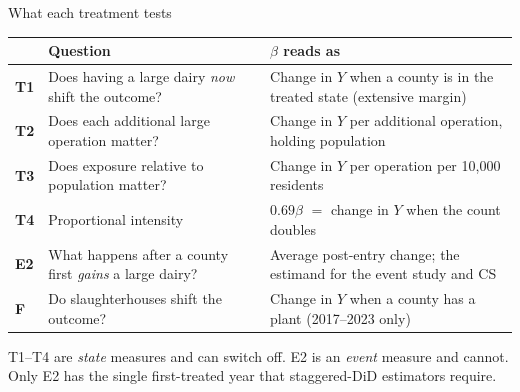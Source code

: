 \documentclass[aspectratio=169]{beamer}
\begin{document}
\begin{frame}{What each treatment tests}
\vspace{-8pt}
\begin{center}\scriptsize
\begin{tabular}{@{}lp{5.2cm}p{5.4cm}@{}}
\toprule
 & Question & $\beta$ reads as \\
\midrule
\textbf{T1} & Does having a large dairy \emph{now} shift the outcome? & Change in $Y$ when a county is in the treated state (extensive margin) \\[0.1em]
\textbf{T2} & Does each additional large operation matter? & Change in $Y$ per additional operation, holding population \\[0.1em]
\textbf{T3} & Does exposure relative to population matter? & Change in $Y$ per operation per 10{,}000 residents \\[0.1em]
\textbf{T4} & Proportional intensity & $0.69\beta$ $=$ change in $Y$ when the count doubles \\[0.1em]
\textbf{E2} & What happens after a county first \emph{gains} a large dairy? & Average post-entry change; the estimand for the event study and CS \\[0.1em]
\textbf{F} & Do slaughterhouses shift the outcome? & Change in $Y$ when a county has a plant (2017--2023 only) \\
\bottomrule
\end{tabular}
\end{center}
\vspace{0.1em}
{\scriptsize T1--T4 are \emph{state} measures and can switch off. E2 is an \emph{event} measure and cannot. Only E2 has the single first-treated year that staggered-DiD estimators require.}
\end{frame}
\end{document}
